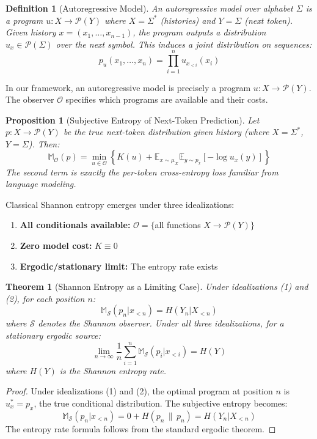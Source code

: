 \documentclass[11pt]{article}
\newtheorem{definition}{Definition}
\newtheorem{proposition}{Proposition}
\newtheorem{theorem}{Theorem}
\begin{document}
\begin{definition}[Autoregressive Model]
An \emph{autoregressive model} over alphabet $\Sigma$ is a program $u: X \to \mathcal{P}(Y)$ where $X = \Sigma^*$ (histories) and $Y = \Sigma$ (next token). Given history $x = (x_1, \ldots, x_{n-1})$, the program outputs a distribution $u_x \in \mathcal{P}(\Sigma)$ over the next symbol. This induces a joint distribution on sequences:
\[ p_u(x_1, \ldots, x_n) = \prod_{i=1}^{n} u_{x_{<i}}(x_i) \]
\end{definition}

In our framework, an autoregressive model is precisely a program $u: X \to \mathcal{P}(Y)$. The observer $\mathcal{O}$ specifies which programs are available and their costs.

\begin{proposition}[Subjective Entropy of Next-Token Prediction]
Let $p: X \to \mathcal{P}(Y)$ be the true next-token distribution given history (where $X = \Sigma^*$, $Y = \Sigma$). Then:
\[ \mathbb{M}_\mathcal{O}(p) = \min_{u \in \mathcal{O}} \left\{ K(u) + \mathbb{E}_{x \sim \mu_X}\mathbb{E}_{y \sim p_x}[-\log u_x(y)] \right\} \]
The second term is exactly the per-token cross-entropy loss familiar from language modeling.
\end{proposition}

Classical Shannon entropy emerges under three idealizations:

\begin{enumerate}
    \item \textbf{All conditionals available:} $\mathcal{O} = \{$all functions $X \to \mathcal{P}(Y)\}$
    \item \textbf{Zero model cost:} $K \equiv 0$
    \item \textbf{Ergodic/stationary limit:} The entropy rate exists
\end{enumerate}

\begin{theorem}[Shannon Entropy as a Limiting Case]
Under idealizations (1) and (2), for each position $n$:
\[ \mathbb{M}_\mathcal{S}(p_n | x_{<n}) = H(Y_n | X_{<n}) \]
where $\mathcal{S}$ denotes the Shannon observer. Under all three idealizations, for a stationary ergodic source:
\[ \lim_{n \to \infty} \frac{1}{n} \sum_{i=1}^{n} \mathbb{M}_\mathcal{S}(p_i | x_{<i}) = H(Y) \]
where $H(Y)$ is the Shannon entropy rate.
\end{theorem}

\begin{proof}
Under idealizations (1) and (2), the optimal program at position $n$ is $u^*_x = p_x$, the true conditional distribution. The subjective entropy becomes:
\[ \mathbb{M}_\mathcal{S}(p_n | x_{<n}) = 0 + H(p_n \,\|\, p_n) = H(Y_n | X_{<n}) \]
The entropy rate formula follows from the standard ergodic theorem.
\end{proof}
\end{document}
